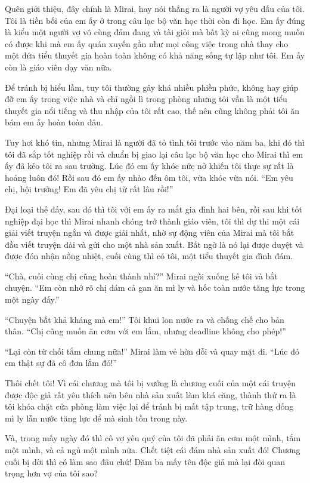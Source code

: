 {Quên giới thiệu, đây chính là Mirai, hay nói thẳng ra là người vợ yêu
dấu của tôi. Tôi là tiền bối của em ấy ở trong câu lạc bộ văn học thời
còn đi học. Em ấy đúng là kiểu một người vợ vô cùng đảm đang và tài giỏi
mà bất kỳ ai cũng mong muốn có được khi mà em ấy quán xuyến gần như mọi
công việc trong nhà thay cho một đứa tiểu thuyết gia hoàn toàn không có
khả năng sống tự lập như tôi. Em ấy còn là giáo viên dạy văn nữa.

Để tránh bị hiểu lầm, tuy tôi thường gây khá nhiều phiền phức, không hay
giúp đỡ em ấy trong việc nhà và chỉ ngồi lì trong phòng nhưng tôi vẫn là
một tiểu thuyết gia nổi tiếng và thu nhập của tôi rất cao, thế nên cũng
không phải tôi ăn bám em ấy hoàn toàn đâu.

Tuy hơi khó tin, nhưng Mirai là người đã tỏ tình tôi trước vào năm ba,
khi đó thì tôi đã sắp tốt nghiệp rồi và chuẩn bị giao lại câu lạc bộ văn
học cho Mirai thì em ấy đã kéo tôi ra sau trường. Lúc đó em ấy khóc nức
nở khiến tôi thực sự rất là hoảng luôn đó! Rồi sau đó em ấy nhào đến ôm
tôi, vừa khóc vừa nói. ``Em yêu chị, hội trưởng! Em đã yêu chị từ rất
lâu rồi!''

Đại loại thế đấy, sau đó thì tôi với em ấy ra mắt gia đình hai bên, rồi
sau khi tốt nghiệp đại học thì Mirai nhanh chóng trở thành giáo viên,
tôi thì dự thi một cái giải viết truyện ngắn và được giải nhất, nhờ sự
động viên của Mirai mà tôi bắt đầu viết truyện dài và gửi cho một nhà
sản xuất. Bất ngờ là nó lại được duyệt và được đón nhận nồng nhiệt, cuối
cùng thì có tôi, một tiểu thuyết gia đình đám.

``Chà, cuối cùng chị cũng hoàn thành nhỉ?'' Mirai ngồi xuống kế tôi và
bắt chuyện. ``Em còn nhớ rõ chị dám cả gan ăn mì ly và hốc toàn nước
tăng lực trong một ngày đấy.''

``Chuyện bất khả kháng mà em!'' Tôi khui lon nước ra và chống chế cho
bản thân. ``Chị cũng muốn ăn cơm với em lắm, nhưng deadline không cho
phép!''

``Lại còn từ chối tắm chung nữa!'' Mirai làm vẻ hờn dỗi và quay mặt đi.
``Lúc đó em thật sự đã cô đơn lắm đó!''

Thôi chết tôi! Vì cái chương mà tôi bị vướng là chương cuối của một cái
truyện được độc giả rất yêu thích nên bên nhà sản xuất làm khá căng,
thành thử ra là tôi khóa chặt cửa phòng làm việc lại để tránh bị mất tập
trung, trữ hàng đống mì ly lẫn nước tăng lực để mà sinh tồn trong này.

Và, trong mấy ngày đó thì cô vợ yêu quý của tôi đã phải ăn cơm một mình,
tắm một mình, và cả ngủ một mình nữa. Chết tiệt cái đám nhà sản xuất đó!
Chương cuối bị dời thì có làm sao đâu chứ! Dăm ba mấy tên độc giả mà lại
đòi quan trọng hơn vợ của tôi sao?

}
